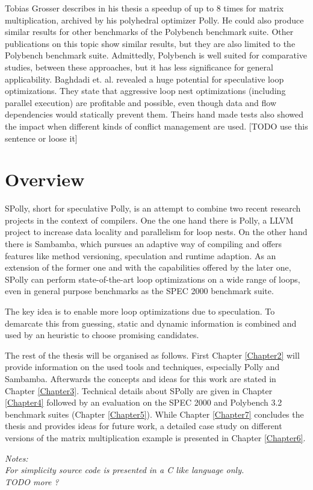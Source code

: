 Tobias Grosser describes in his thesis\cite{grosser:thesis} a speedup of up to
$8$ times for matrix multiplication, archived by his polyhedral optimizer 
Polly\cite{grosser.11.impact}. He could also produce similar results for other
benchmarks of the Polybench\cite{Polybench:Online} benchmark suite. 
Other publications on this 
topic\cite{Bondhugula:2008:PAP:1379022.1375595,BCBPR10,Pradelle:2012:PPB:2086696.2086718} 
show similar results, but they are also limited to the Polybench benchmark suite.
Admittedly, Polybench is well suited for comparative studies, between these 
approaches, but it has less significance for general applicability. 
Baghdadi et. al.\cite{BCBPR10} revealed a huge potential for speculative loop 
optimizations. They state that aggressive loop nest optimizations (including 
parallel execution) are profitable and possible, even though data and flow 
dependencies would statically prevent them. 
Theirs hand made tests also showed 
the impact when different kinds of conflict management are used.
[TODO use this sentence or loose it]





\section{Overview}

SPolly, short for speculative Polly,
is an attempt to combine two recent research projects in the context of compilers.
One the one hand there is Polly, a LLVM project to increase data locality
and parallelism for loop nests. On the other hand there is Sambamba, which 
pursues an adaptive way of compiling and offers features like method 
versioning, speculation and runtime adaption. As an extension of the former one
and with the capabilities offered by the later one,
SPolly can perform state-of-the-art loop optimizations on a wide range of loops,
even in general purpose benchmarks as the SPEC 2000 benchmark suite. 

The key idea is to enable more loop optimizations due to speculation.
To demarcate this from guessing, static and dynamic information 
is combined and used by an heuristic to choose promising candidates. 

The rest of the thesis will be organised as follows. 
First Chapter \ref{Chapter2} will provide information on the used tools and techniques,
especially Polly and Sambamba. Afterwards the concepts and ideas for this work
are stated in Chapter \ref{Chapter3}. 
Technical details about SPolly are given in Chapter \ref{Chapter4} followed by 
an evaluation on the SPEC 2000 and Polybench 3.2 benchmark suites 
(Chapter \ref{Chapter5}). 
While Chapter \ref{Chapter7} concludes the thesis and provides ideas for
future work, a detailed case study on different versions of the matrix 
multiplication example is presented in Chapter \ref{Chapter6}. 

\vspace*{4cm}
{\Large \it Notes:\\}
{
  \it
For simplicity source code is presented in a C like language only. \\
TODO more ?
}



